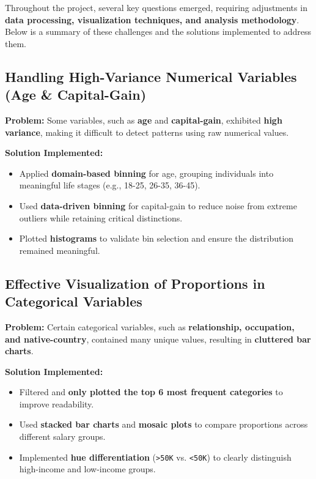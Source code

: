 \documentclass[journal,onecolumn]{IEEEtran}
\begin{document}
\par Throughout the project, several key questions emerged, requiring adjustments in \textbf{data processing, visualization techniques, and analysis methodology}. Below is a summary of these challenges and the solutions implemented to address them.

\subsection{Handling High-Variance Numerical Variables (Age \& Capital-Gain)}

\textbf{Problem:}  
Some variables, such as \textbf{age} and \textbf{capital-gain}, exhibited \textbf{high variance}, making it difficult to detect patterns using raw numerical values.  

\textbf{Solution Implemented:}  
\begin{itemize}
    \item Applied \textbf{domain-based binning} for age, grouping individuals into meaningful life stages (e.g., 18-25, 26-35, 36-45).  
    \item Used \textbf{data-driven binning} for capital-gain to reduce noise from extreme outliers while retaining critical distinctions.  
    \item Plotted \textbf{histograms} to validate bin selection and ensure the distribution remained meaningful.  
\end{itemize}

\subsection{Effective Visualization of Proportions in Categorical Variables}

\textbf{Problem:}  
Certain categorical variables, such as \textbf{relationship, occupation, and native-country}, contained many unique values, resulting in \textbf{cluttered bar charts}.  

\textbf{Solution Implemented:}  
\begin{itemize}
    \item Filtered and \textbf{only plotted the top 6 most frequent categories} to improve readability.  
    \item Used \textbf{stacked bar charts} and \textbf{mosaic plots} to compare proportions across different salary groups.  
    \item Implemented \textbf{hue differentiation} (\texttt{>50K} vs. \texttt{<50K}) to clearly distinguish high-income and low-income groups.  
\end{itemize}
\end{document}
